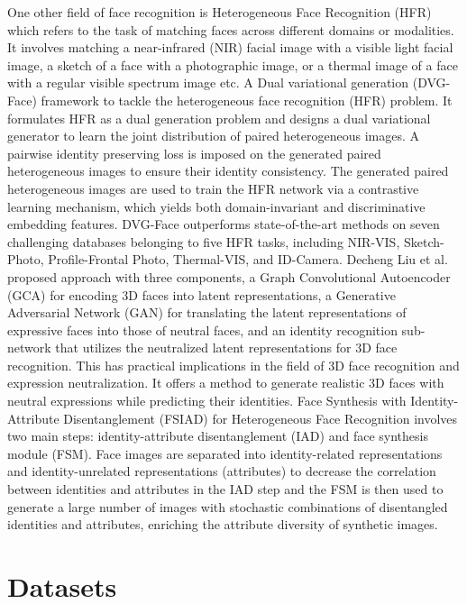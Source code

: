 One other field of face recognition is Heterogeneous Face Recognition (HFR) which refers to the task of matching faces across different domains or modalities. It involves matching a near-infrared (NIR) facial image with a visible light facial image, a sketch of a face with a photographic image, or a thermal image of a face with a regular visible spectrum image etc. A Dual variational generation (DVG-Face) \cite{fu_dvg-face_2022} framework to tackle the heterogeneous face recognition (HFR) problem. It formulates HFR as a dual generation problem and designs a dual variational generator to learn the joint distribution of paired heterogeneous images. A pairwise identity preserving loss is imposed on the generated paired heterogeneous images to ensure their identity consistency. The generated paired heterogeneous images are used to train the HFR network via a contrastive learning mechanism, which yields both domain-invariant and discriminative embedding features. DVG-Face outperforms state-of-the-art methods on seven challenging databases belonging to five HFR tasks, including NIR-VIS, Sketch-Photo, Profile-Frontal Photo, Thermal-VIS, and ID-Camera.
Decheng Liu et al. \cite{liu_heterogeneous_2022} proposed approach with three components, a Graph Convolutional Autoencoder (GCA) for encoding 3D faces into latent representations, a Generative Adversarial Network (GAN) for translating the latent representations of expressive faces into those of neutral faces, and an identity recognition sub-network that utilizes the neutralized latent representations for 3D face recognition. This has practical implications in the field of 3D face recognition and expression neutralization. It offers a method to generate realistic 3D faces with neutral expressions while predicting their identities.
Face Synthesis with Identity-Attribute Disentanglement (FSIAD) \cite{yang_heterogeneous_2022} for Heterogeneous Face Recognition involves two main steps: identity-attribute disentanglement (IAD) and face synthesis module (FSM). Face images are separated into identity-related representations and identity-unrelated representations (attributes) to decrease the correlation between identities and attributes in the IAD step and the FSM is then used to generate a large number of images with stochastic combinations of disentangled identities and attributes, enriching the attribute diversity of synthetic images.

\section{Datasets} \label{section:datasets}

